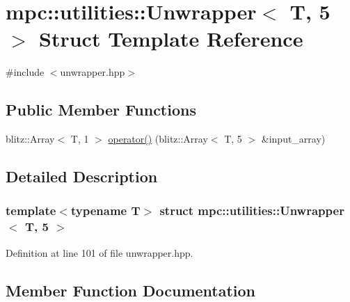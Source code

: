 \hypertarget{structmpc_1_1utilities_1_1_unwrapper_3_01_t_00_015_01_4}{}\section{mpc\+:\+:utilities\+:\+:Unwrapper$<$ T, 5 $>$ Struct Template Reference}
\label{structmpc_1_1utilities_1_1_unwrapper_3_01_t_00_015_01_4}


{\ttfamily \#include $<$unwrapper.\+hpp$>$}

\subsection*{Public Member Functions}
\begin{DoxyCompactItemize}
\item 
blitz\+::\+Array$<$ T, 1 $>$ \mbox{\hyperlink{structmpc_1_1utilities_1_1_unwrapper_3_01_t_00_015_01_4_a1d125aba4e6ba3ec992ec1138f467a1c}{operator()}} (blitz\+::\+Array$<$ T, 5 $>$ \&input\+\_\+array)
\end{DoxyCompactItemize}


\subsection{Detailed Description}
\subsubsection*{template$<$typename T$>$\newline
struct mpc\+::utilities\+::\+Unwrapper$<$ T, 5 $>$}



Definition at line 101 of file unwrapper.\+hpp.



\subsection{Member Function Documentation}
\mbox{\label{structmpc_1_1utilities_1_1_unwrapper_3_01_t_00_015_01_4_a1d125aba4e6ba3ec992ec1138f467a1c}} 

